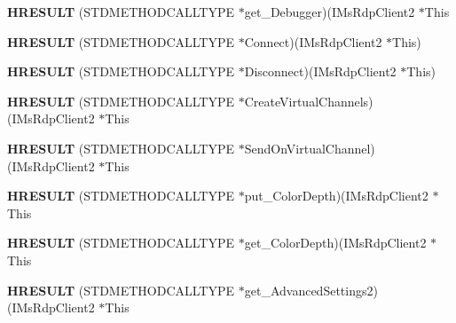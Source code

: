 \begin{DoxyCompactItemize}
{\bfseries H\+R\+E\+S\+U\+LT} (S\+T\+D\+M\+E\+T\+H\+O\+D\+C\+A\+L\+L\+T\+Y\+PE $\ast$get\+\_\+\+Debugger)(I\+Ms\+Rdp\+Client2 $\ast$This
\item 
\mbox{\label{struct_i_ms_rdp_client2_vtbl_a7e24bdf436597280646d17f5e1845c6c}} 
{\bfseries H\+R\+E\+S\+U\+LT} (S\+T\+D\+M\+E\+T\+H\+O\+D\+C\+A\+L\+L\+T\+Y\+PE $\ast$Connect)(I\+Ms\+Rdp\+Client2 $\ast$This)
\item 
\mbox{\label{struct_i_ms_rdp_client2_vtbl_ae3f40ab7386eb82e678ea85e19fa28b7}} 
{\bfseries H\+R\+E\+S\+U\+LT} (S\+T\+D\+M\+E\+T\+H\+O\+D\+C\+A\+L\+L\+T\+Y\+PE $\ast$Disconnect)(I\+Ms\+Rdp\+Client2 $\ast$This)
\item 
\mbox{\label{struct_i_ms_rdp_client2_vtbl_aacf7f9e245f4e3f9dd38cefb7e68c257}} 
{\bfseries H\+R\+E\+S\+U\+LT} (S\+T\+D\+M\+E\+T\+H\+O\+D\+C\+A\+L\+L\+T\+Y\+PE $\ast$Create\+Virtual\+Channels)(I\+Ms\+Rdp\+Client2 $\ast$This
\item 
\mbox{\label{struct_i_ms_rdp_client2_vtbl_aa39160ac6dae150a6be768fdc2cd0968}} 
{\bfseries H\+R\+E\+S\+U\+LT} (S\+T\+D\+M\+E\+T\+H\+O\+D\+C\+A\+L\+L\+T\+Y\+PE $\ast$Send\+On\+Virtual\+Channel)(I\+Ms\+Rdp\+Client2 $\ast$This
\item 
\mbox{\label{struct_i_ms_rdp_client2_vtbl_a6bb63382d0cd705f66fcdf02706605d0}} 
{\bfseries H\+R\+E\+S\+U\+LT} (S\+T\+D\+M\+E\+T\+H\+O\+D\+C\+A\+L\+L\+T\+Y\+PE $\ast$put\+\_\+\+Color\+Depth)(I\+Ms\+Rdp\+Client2 $\ast$This
\item 
\mbox{\label{struct_i_ms_rdp_client2_vtbl_ada2bf67d69d5ff58e660ea2fc9ae8a48}} 
{\bfseries H\+R\+E\+S\+U\+LT} (S\+T\+D\+M\+E\+T\+H\+O\+D\+C\+A\+L\+L\+T\+Y\+PE $\ast$get\+\_\+\+Color\+Depth)(I\+Ms\+Rdp\+Client2 $\ast$This
\item 
\mbox{\label{struct_i_ms_rdp_client2_vtbl_a21b23992ac10b135f4553281f8f9fb39}} 
{\bfseries H\+R\+E\+S\+U\+LT} (S\+T\+D\+M\+E\+T\+H\+O\+D\+C\+A\+L\+L\+T\+Y\+PE $\ast$get\+\_\+\+Advanced\+Settings2)(I\+Ms\+Rdp\+Client2 $\ast$This
\item 
\mbox{\label{struct_i_ms_rdp_client2_vtbl_a579bdde04aa8b96162ff62375a2a74b6}} 

\end{DoxyCompactItemize}
